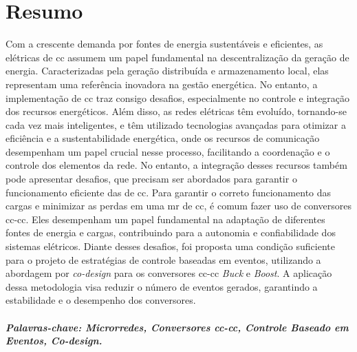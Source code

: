 \chapter*{Resumo}
\thispagestyle{empty}

Com a crescente demanda por fontes de energia sustentáveis e eficientes, as  elétricas de \acrfull{cc} assumem um papel fundamental na descentralização da geração de energia. Caracterizadas pela geração distribuída e armazenamento local, elas representam uma referência inovadora na gestão energética. No entanto, a implementação de  \acrshort{cc} traz consigo desafios, especialmente no controle e integração dos recursos energéticos. Além disso, as redes elétricas têm evoluído, tornando-se cada vez mais inteligentes, e têm utilizado tecnologias avançadas para otimizar a eficiência e a sustentabilidade energética, onde os recursos de comunicação desempenham um papel crucial nesse processo, facilitando a coordenação e o controle dos elementos da rede. No entanto, a integração desses recursos também pode apresentar desafios, que precisam ser abordados para garantir o funcionamento eficiente das  de \acrshort{cc}. Para garantir o correto funcionamento das cargas e minimizar as perdas em uma \acrshort{mr} de \acrshort{cc}, é comum fazer uso de conversores \acrshort{cc}-\acrshort{cc}. Eles desempenham um papel fundamental na adaptação de diferentes fontes de energia e cargas, contribuindo para a autonomia e confiabilidade dos sistemas elétricos. Diante desses desafios, foi proposta uma condição suficiente para o projeto de estratégias de controle baseadas em eventos, utilizando a abordagem por \textit{co-design} para os conversores \acrshort{cc}-\acrshort{cc} \textit{Buck} e \textit{Boost}. A aplicação dessa metodologia visa reduzir o número de eventos gerados, garantindo a estabilidade e o desempenho dos conversores.

\vspace{50pt}

\paragraph{Palavras-chave: Microrredes, Conversores \acrshort{cc}-\acrshort{cc}, Controle Baseado em Eventos, \textit{Co-design.}}
